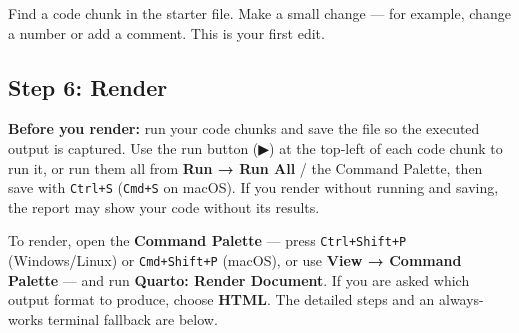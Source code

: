 \documentclass[
  letterpaper,
  DIV=11,
  numbers=noendperiod,
  oneside]{scrreprt}
\begin{document}
Find a code chunk in the starter file. Make a small change --- for
example, change a number or add a comment. This is your first edit.

\subsection*{Step 6: Render}\label{step-6-render}

\textbf{Before you render:} run your code chunks and save the file so
the executed output is captured. Use the run button (▶) at the top-left
of each code chunk to run it, or run them all from \textbf{Run → Run
All} / the Command Palette, then save with \texttt{Ctrl+S}
(\texttt{Cmd+S} on macOS). If you render without running and saving, the
report may show your code without its results.

To render, open the \textbf{Command Palette} --- press
\texttt{Ctrl+Shift+P} (Windows/Linux) or \texttt{Cmd+Shift+P} (macOS),
or use \textbf{View → Command Palette} --- and run \textbf{Quarto:
Render Document}. If you are asked which output format to produce,
choose \textbf{HTML}. The detailed steps and an always-works terminal
fallback are below.
\end{document}
